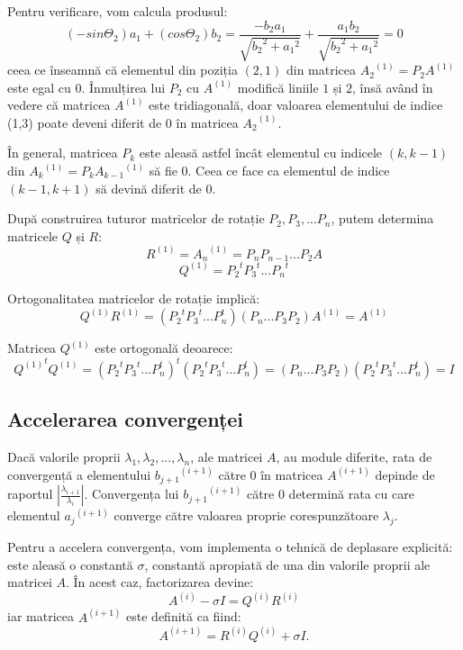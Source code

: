 \documentclass{exam}
\begin{document}
Pentru verificare, vom calcula produsul:
$$(-sin\Theta_{2})a_{1} + (cos\Theta_{2})b_{2} = \frac{-b_{2}a_{1}}{\sqrt{{b_{2}}^{2}+{{a_{1}}^{2}}}} + \frac{a_{1}b_{2}}{\sqrt{{b_{2}}^{2}+{{a_{1}}^{2}}}} = 0$$
ceea ce înseamnă că elementul din poziția $(2,1)$ din matricea ${A_{2}}^{(1)} = P_{2}A^{(1)}$ este egal cu 0.
Înmulțirea lui $P_{2}$ cu $A^{(1)}$ modifică liniile $1$ și $2$, însă având în vedere că matricea $A^{(1)}$ este tridiagonală, doar valoarea elementului de indice (1,3) poate deveni diferit de $0$ în matricea ${A_{2}}^{(1)}$.

În general, matricea $P_{k}$ este aleasă astfel încât elementul cu indicele $(k, k-1)$ din ${A_{k}}^{(1)}=P_{k}{A_{k-1}}^{(1)}$ să fie $0$. Ceea ce face ca elementul de indice $(k-1, k+1)$ să devină diferit de $0$.

După construirea tuturor matricelor de rotație $P_{2}, P_{3},...P_{n}$, putem determina matricele $Q$ și $R$:
$$R^{(1)} = {A_{n}}^{(1)} = P_{n}P_{n-1}...P_{2}A$$
$$Q^{(1)} = {P_{2}}^{t}{P_{3}}^{t}...{P_{n}}^{t}$$

Ortogonalitatea matricelor de rotație implică:
$$Q^{(1)}R^{(1)} = ({P_{2}}^{t}{P_{3}}^{t}...{P_{n}^{t}})(P_{n}...P_{3}P_{2})A^{(1)} = A^{(1)}$$

Matricea $Q^{(1)}$ este ortogonală deoarece:
$${Q^{(1)}}^{t}Q^{(1)} = {({P_{2}}^{t}{P_{3}}^{t}...{P_{n}^{t}})}^{t}({P_{2}}^{t}{P_{3}}^{t}...{P_{n}^{t}}) = (P_{n}...P_{3}P_{2})({P_{2}}^{t}{P_{3}}^{t}...{P_{n}^{t}}) = I$$


\subsection{Accelerarea convergenței}

Dacă valorile proprii $\lambda_{1}, \lambda_{2},..., \lambda_{n}$, ale matricei $A$, au module diferite,  rata de convergență a elementului ${b_{j+1}}^{(i+1)}$ către $0$ în matricea $A^{(i+1)}$ depinde de raportul $\left|\frac{\lambda_{i+1}}{\lambda_{i}}\right|$. Convergența lui ${b_{j+1}}^{(i+1)}$ către $0$ determină rata cu care elementul ${a_{j}}^{(i+1)}$ converge către valoarea proprie corespunzătoare $\lambda_{j}$.

Pentru a accelera convergența, vom implementa o tehnică de deplasare explicită: este aleasă o constantă $\sigma$, \mbox{constantă} apropiată de una din valorile proprii ale matricei $A$. În acest caz, factorizarea devine:
$$A^{(i)} - \sigma I = Q^{(i)}R^{(i)}$$
iar matricea $A^{(i+1)}$ este definită ca fiind:
$$A^{(i+1)} = R^{(i)}Q^{(i)} + \sigma I. $$
\end{document}
